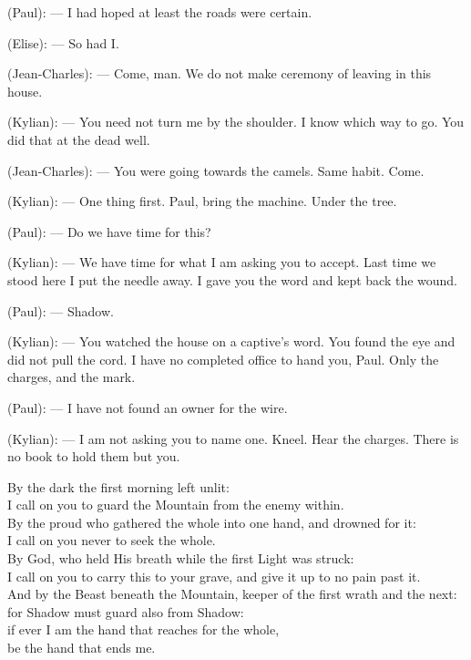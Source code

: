\begin{room}
(Paul): --- I had hoped at least the roads were certain.

(Elise): --- So had I.

(Jean-Charles): --- Come, man. We do not make ceremony of leaving in this house.

(Kylian): --- You need not turn me by the shoulder. I know which way to go. You did that at the dead well.

(Jean-Charles): --- You were going towards the camels. Same habit. Come.

(Kylian): --- One thing first. Paul, bring the machine. Under the tree.

\centerline{}

(Paul): --- Do we have time for this?

(Kylian): --- We have time for what I am asking you to accept. Last time we stood here I put the needle away. I gave you the word and kept back the wound.

(Paul): --- Shadow.

(Kylian): --- You watched the house on a captive's word. You found the eye and did not pull the cord. I have no completed office to hand you, Paul. Only the charges, and the mark.

(Paul): --- I have not found an owner for the wire.

(Kylian): --- I am not asking you to name one. Kneel. Hear the charges. There is no book to hold them but you.

\begin{scripture}
By the dark the first morning left unlit: \\
I call on you to guard the Mountain from the enemy within. \\
By the proud who gathered the whole into one hand, and drowned for it: \\
I call on you never to seek the whole. \\
By God, who held His breath while the first Light was struck: \\
I call on you to carry this to your grave, and give it up to no pain past it. \\
And by the Beast beneath the Mountain, keeper of the first wrath and the next: \\
for Shadow must guard also from Shadow: \\
if ever I am the hand that reaches for the whole, \\
be the hand that ends me.
\end{scripture}


\end{room}
